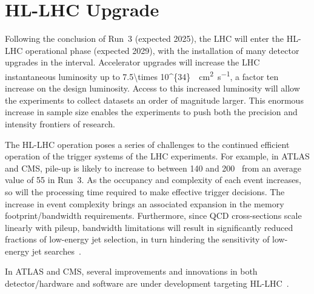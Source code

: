 \section{HL-LHC Upgrade}



Following the conclusion of Run~3 (expected 2025), the LHC will enter the HL-LHC operational phase (expected 2029), with the installation of many detector upgrades in the interval. Accelerator upgrades will increase the LHC instantaneous luminosity up to \SI{7.5\times 10^{34}}{\per\square\cm\per\second}, a factor ten increase on the design luminosity. Access to this increased luminosity will allow the experiments to collect datasets an order of magnitude larger. This enormous increase in sample size enables the experiments to push both the precision and intensity frontiers of research.

The HL-LHC operation poses a series of challenges to the continued efficient operation of the trigger systems of the LHC experiments. For example, in ATLAS and CMS, pile-up is likely to increase to between 140 and 200~\cite{ATLAS:pileup} from an average value of 55 in Run~3. As the occupancy and complexity of each event increases, so will the processing time required to make effective trigger decisions. %
The increase in event complexity brings an associated expansion in the memory footprint/bandwidth requirements. 
Furthermore, since QCD cross-sections scale linearly with pileup, bandwidth limitations will result in significantly reduced fractions of low-energy jet selection, in turn hindering the sensitivity of low-energy jet searches~\cite{albrecht2018hep}.

In ATLAS and CMS, several improvements and innovations in both detector/hardware and software are under development targeting HL-LHC~\cite{hl-lhc}.

